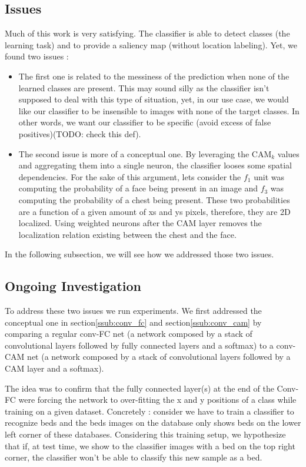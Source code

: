 		\subsection{Issues}
		\label{sub:issues}
			Much of this work is very satisfying. The classifier is able to detect classes (the learning task) and to provide a saliency map (without location labeling). Yet, we found two issues : 
			\begin{itemize}
				\item The first one is related to the messiness of the prediction when none of the learned classes are present. This may sound silly as the classifier isn't supposed to deal with this type of situation, yet, in our use case, we would like our classifier to be insensible to images with none of the target classes. In other words, we want our classifier to be specific (avoid excess of false positives)(TODO: check this def).
				\item The second issue is more of a conceptual one. By leveraging the $\text{CAM}_k$ values and aggregating them into a single neuron, the classifier looses some spatial dependencies. 
				For the sake of this argument, lets consider the $f_1$ unit was computing the probability of a face being present in an image and $f_3$ was computing the probability of a chest being present. These two probabilities are a function of a given amount of xs and ys pixels, therefore, they are 2D localized. Using weighted neurons after the CAM layer removes the localization relation existing between the chest and the face.
			\end{itemize}
			In the following subsection, we will see how we addressed those two issues.

		\subsection{Ongoing Investigation}
		\label{sub:ongoing_investigation}
			To address these two issues we run experiments. We first addressed the conceptual one in section\ref{ssub:conv_fc} and section\ref{ssub:conv_cam} by comparing a regular conv-FC net (a network composed by a stack of convolutional layers followed by fully connected layers and a softmax) to a conv-CAM net (a network composed by a stack of convolutional layers followed by a CAM layer and a softmax). 
			
			The idea was to confirm that the fully connected layer(s) at the end of the Conv-FC were forcing the network to over-fitting the x and y positions of a class while training on a given dataset. Concretely : consider we have to train a classifier to recognize beds and the beds images on the database only shows beds on the lower left corner of these databases. Considering this training setup, we hypothesize that if, at test time, we show to the classifier images with a bed on the top right corner, the classifier won't be able to classify this new sample as a bed.

